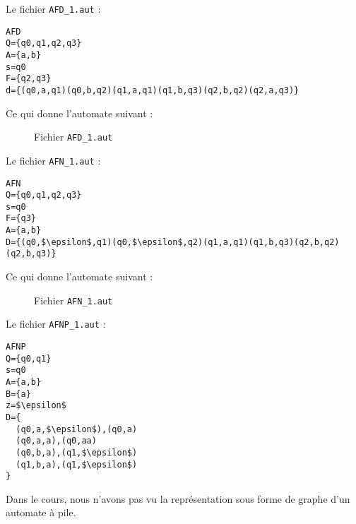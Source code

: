 \documentclass[12pt,a4paper]{article}
\begin{document}
\noindent Le fichier \texttt{AFD\_1.aut} :
\begin{lstlisting}[mathescape,frame=single]
AFD
Q={q0,q1,q2,q3}
A={a,b}
s=q0
F={q2,q3}
d={(q0,a,q1)(q0,b,q2)(q1,a,q1)(q1,b,q3)(q2,b,q2)(q2,a,q3)}
\end{lstlisting}
Ce qui donne l'automate suivant :
\begin{figure}[ht]
  \centering
  \caption{Fichier \texttt{AFD\_1.aut}}
\end{figure}

\noindent Le fichier \texttt{AFN\_1.aut} :
\begin{lstlisting}[mathescape,frame=single]
AFN
Q={q0,q1,q2,q3}
s=q0
F={q3}
A={a,b}
D={(q0,$\epsilon$,q1)(q0,$\epsilon$,q2)(q1,a,q1)(q1,b,q3)(q2,b,q2)(q2,b,q3)}
\end{lstlisting}
Ce qui donne l'automate suivant :
\begin{figure}[ht]
  \centering
  \caption{Fichier \texttt{AFN\_1.aut}}
\end{figure}

\noindent Le fichier \texttt{AFNP\_1.aut} :
\begin{lstlisting}[mathescape,frame=single]
AFNP
Q={q0,q1}
s=q0
A={a,b}
B={a}
z=$\epsilon$
D={
  (q0,a,$\epsilon$),(q0,a)
  (q0,a,a),(q0,aa)
  (q0,b,a),(q1,$\epsilon$)
  (q1,b,a),(q1,$\epsilon$)
}
\end{lstlisting}

Dans le cours, nous n'avons pas vu la représentation sous forme de graphe d'un automate à pile.
\end{document}

